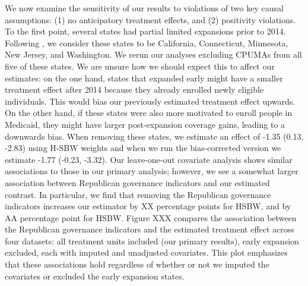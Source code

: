 \documentclass[12pt]{article}
\begin{document}
We now examine the sensitivity of our results to violations of two key causal assumptions: (1) no anticipatory treatment effects, and (2) positivity violations. To the first point, several states had partial limited expansions prior to 2014. Following \cite{frean2017premium}, we consider these states to be California, Connecticut, Minnesota, New Jersey, and Washington. We rerun our analyses excluding CPUMAs from all five of these states. We are unsure how we should expect this to affect our estimates: on the one hand, states that expanded early might have a smaller treatment effect after 2014 because they already enrolled newly eligible individuals. This would bias our previously estimated treatment effect upwards. On the other hand, if these states were also more motivated to enroll people in Medicaid, they might have larger post-expansion coverage gains, leading to a downwards bias. When removing these states, we estimate an effect of -1.35 (0.13, -2.83) using H-SBW weights and when we run the bias-corrected version we estimate -1.77 (-0.23, -3.32). Our leave-one-out covariate analysis shows similar associations to those in our primary analysis; however, we see a somewhat larger association between Republican governance indicators and our estimated contrast. In particular, we find that removing the Republican governance indicators increases our estimator by XX percentage points for HSBW, and by AA percentage point for HSBW. Figure XXX compares the association between the Republican governance indicators and the estimated treatment effect across four datasets: all treatment units included (our primary results), early expansion excluded, each with imputed and unadjusted covariates. This plot emphasizes that these associations hold regardless of whether or not we imputed the covariates or excluded the early expansion states.
\end{document}
